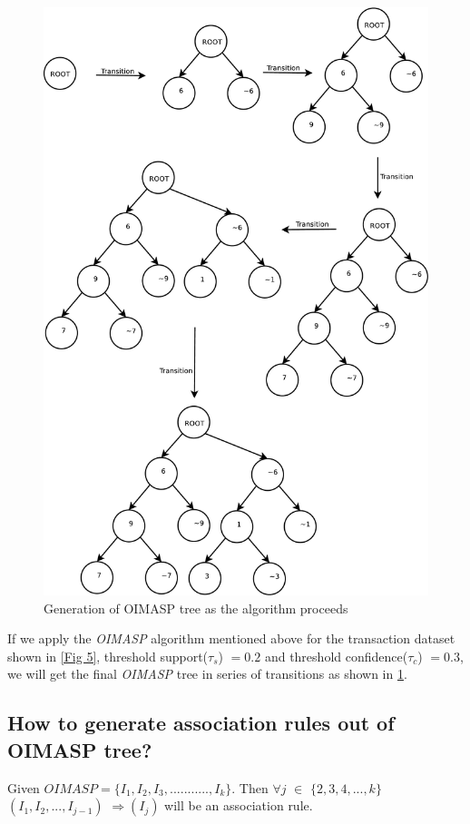 \documentclass[review]{elsarticle}
\begin{document}
\begin{figure}
\begin{center}
\includegraphics[scale=0.3]{pdf/transition}
\end{center}
\caption{Generation of OIMASP tree as the algorithm proceeds}
\label{Fig 6}
\end{figure}

If we apply the \emph{OIMASP} algorithm mentioned above for the transaction dataset shown in \ref{Fig 5}, threshold support($ \tau _{s} $) $ = 0.2 $ and threshold confidence($ \tau _{c} $) $ = 0.3 $, we will get the final \emph{OIMASP} tree in series of transitions as shown in \ref{Fig 6}.

\subsection{How to generate association rules out of OIMASP tree?}
\begin{rmk}
	Given $ OIMASP = \{I_{1}, I_{2}, I_{3}, ..........., I_{k}\} $. Then $ \forall j $ $ \in $ $ \lbrace 2, 3, 4, 		..., k \rbrace $ $ (I_{1}, I_{2}, ..., I_{j-1})$ $ \Rightarrow (I_{j}) $ will be an association rule.		
\end{rmk}
\end{document}
